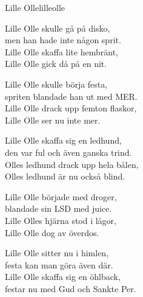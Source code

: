 \begin{song}{Lille Olle}{lilleolle}
\begin{vers}
Lille Olle skulle gå på disko,  \\
men han hade inte någon sprit. \\
Lille Olle skaffa lite hembränt,  \\
Lille Olle gick då på en nit.\\
\end{vers}
\begin{vers}
Lille Olle skulle börja festa,\\
spriten blandade han ut med MER.\\
Lille Olle drack upp femton flaskor,\\
Lille Olle ser nu inte mer.\\
\end{vers}
\begin{vers}
Lille Olle skaffa sig en ledhund,\\
den var ful och även ganska trind.\\
Olles ledhund drack upp hela bålen,\\
Olles ledhund är nu också blind.\\
\end{vers}
\begin{vers}
Lille Olle började med droger,\\
blandade sin LSD med juice.\\
Lille Olles hjärna stod i lågor,\\
Lille Olle dog av överdos.\\
\end{vers}
\begin{vers}
Lille Olle sitter nu i himlen,\\
festa kan man göra även där.\\
Lille Olle skaffa sig en öhlback,\\
festar nu med Gud och Sankte Per.\\
\end{vers}
\end{song}
